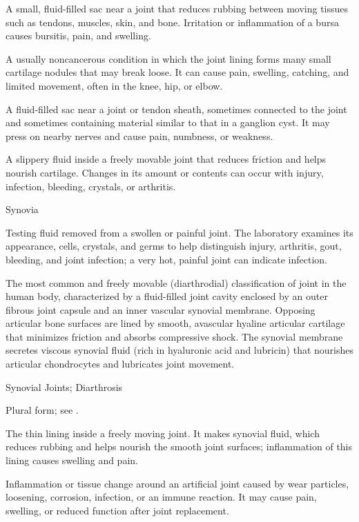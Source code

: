  A small, fluid-filled sac near a joint that reduces rubbing between moving tissues such as tendons, muscles, skin, and bone. Irritation or inflammation of a bursa causes bursitis, pain, and swelling.

 A usually noncancerous condition in which the joint lining forms many small cartilage nodules that may break loose. It can cause pain, swelling, catching, and limited movement, often in the knee, hip, or elbow.

 A fluid-filled sac near a joint or tendon sheath, sometimes connected to the joint and sometimes containing material similar to that in a ganglion cyst. It may press on nearby nerves and cause pain, numbness, or weakness.

 A slippery fluid inside a freely movable joint that reduces friction and helps nourish cartilage. Changes in its amount or contents can occur with injury, infection, bleeding, crystals, or arthritis.

\synonyms
Synovia

 Testing fluid removed from a swollen or painful joint. The laboratory examines its appearance, cells, crystals, and germs to help distinguish injury, arthritis, gout, bleeding, and joint infection; a very hot, painful joint can indicate infection.

 The most common and freely movable (diarthrodial) classification of joint in the human body, characterized by a fluid-filled joint cavity enclosed by an outer fibrous joint capsule and an inner vascular synovial membrane. Opposing articular bone surfaces are lined by smooth, avascular hyaline articular cartilage that minimizes friction and absorbs compressive shock. The synovial membrane secretes viscous synovial fluid (rich in hyaluronic acid and lubricin) that nourishes articular chondrocytes and lubricates joint movement.

\synonyms
Synovial Joints; Diarthrosis

 Plural form; see .

 The thin lining inside a freely moving joint. It makes synovial fluid, which reduces rubbing and helps nourish the smooth joint surfaces; inflammation of this lining causes swelling and pain.

 Inflammation or tissue change around an artificial joint caused by wear particles, loosening, corrosion, infection, or an immune reaction. It may cause pain, swelling, or reduced function after joint replacement.

